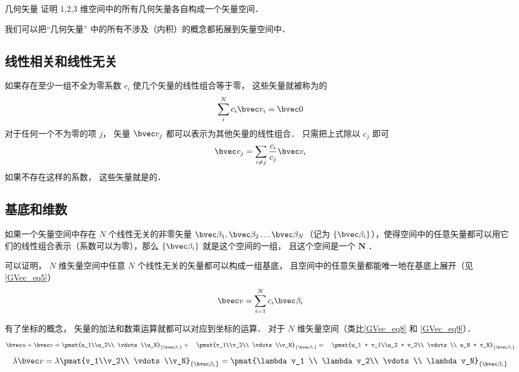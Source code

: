 \begin{exer}{几何矢量}
证明 1,2,3 维空间中的所有几何矢量各自构成一个矢量空间．
\end{exer}

我们可以把“几何矢量” 中的所有不涉及（内积）的概念都拓展到矢量空间中．

\subsection{线性相关和线性无关}
如果存在至少一组不全为零系数 $c_i$ 使几个矢量的线性组合等于零， 这些矢量就被称为的
\begin{equation}
\sum_i^N c_i \bvec v_i = \bvec 0
\end{equation}
对于任何一个不为零的项 $j$， 矢量 $\bvec v_j$ 都可以表示为其他矢量的线性组合． 只需把上式除以 $c_j$ 即可
\begin{equation}
\bvec v_j = \sum_{i \ne j}\frac{c_i}{c_j} \bvec v_i
\end{equation}
如果不存在这样的系数， 这些矢量就是的． 

\subsection{基底和维数}
如果一个矢量空间中存在 $N$ 个线性无关的非零矢量 $\bvec \beta_1, \bvec \beta_2 \dots \bvec \beta_N$（记为 $\{\bvec \beta_i\}$），使得空间中的任意矢量都可以用它们的线性组合表示（系数可以为零），那么 $\{\bvec \beta_i\}$ 就是这个空间的一组， 且这个空间是一个 $\boldsymbol{N}$ ．

可以证明， $N$ 维矢量空间中任意 $N$ 个线性无关的矢量都可以构成一组基底， 且空间中的任意矢量都能唯一地在基底上展开（见\autoref{GVec_eq5}）
\begin{equation}
\bvec v = \sum_{i=1}^N c_i \bvec \beta_i
\end{equation}

有了坐标的概念， 矢量的加法和数乘运算就都可以对应到坐标的运算． 对于 $N$ 维矢量空间（类比\autoref{GVec_eq8} 和 \autoref{GVec_eq9}）．
\begin{equation}
\bvec u + \bvec v = \pmat{u_1\\u_2\\ \vdots\\u_N}_{\{\bvec\beta_i\}} + \quad \pmat{v_1\\v_2\\ \vdots \\v_N}_{\{\bvec\beta_i\}} = \quad \pmat{u_1 + v_1\\u_2 + v_2\\ \vdots \\ u_N + v_N}_{\{\bvec\beta_i\}}
\end{equation}
\begin{equation}
\lambda \bvec v = \lambda\pmat{v_1\\v_2\\ \vdots \\v_N}_{\{\bvec\beta_i\}} = \pmat{\lambda v_1 \\ \lambda v_2\\ \vdots \\ \lambda v_N}_{\{\bvec\beta_i\}}
\end{equation}

